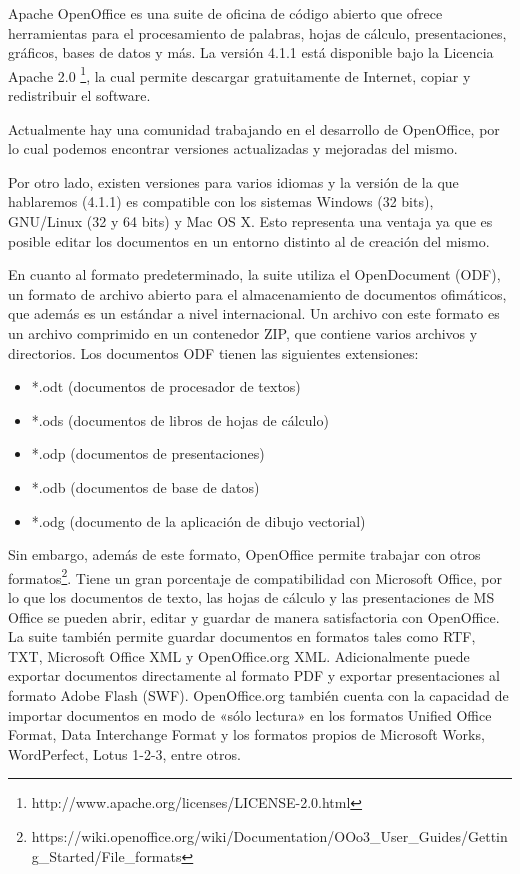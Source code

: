 \documentclass[12pt]{article}
\begin{document}
Apache OpenOffice es una suite de oficina de código abierto que ofrece herramientas para el procesamiento de palabras, hojas de cálculo, presentaciones, gráficos, bases de datos y más. La versión 4.1.1 está disponible bajo la Licencia Apache 2.0 \footnote{http://www.apache.org/licenses/LICENSE-2.0.html}, la cual permite descargar gratuitamente de Internet, copiar y redistribuir el software.   

Actualmente hay una comunidad trabajando en el desarrollo de OpenOffice, por lo cual podemos encontrar versiones actualizadas y mejoradas del mismo.

Por otro lado, existen versiones para varios idiomas y la versión de la que hablaremos (4.1.1) es compatible con los sistemas Windows (32 bits), GNU/Linux (32 y 64 bits) y Mac OS X. Esto representa una ventaja ya que es posible editar los documentos en un entorno distinto al de creación del mismo.


En cuanto al formato predeterminado, la suite utiliza el OpenDocument (ODF), un formato de archivo abierto para el almacenamiento de documentos ofimáticos, que además es un estándar a nivel internacional. Un archivo con este formato es un archivo comprimido en un contenedor ZIP, que contiene varios archivos y directorios. Los documentos ODF tienen las siguientes extensiones:
\begin{itemize}
\item *.odt (documentos de procesador de textos)
\item *.ods (documentos de libros de hojas de cálculo)
\item *.odp (documentos de presentaciones)
\item *.odb (documentos de base de datos)
\item *.odg (documento de la aplicación de dibujo vectorial)
\end{itemize}

Sin embargo, además de este formato, OpenOffice permite trabajar con otros formatos\footnote{https://wiki.openoffice.org/wiki/Documentation/OOo3\_User\_Guides/Getting\_Started/File\_formats}. Tiene un gran porcentaje de compatibilidad con Microsoft Office, por lo que los documentos de texto, las hojas de cálculo y las presentaciones de MS Office se pueden abrir, editar y guardar de manera satisfactoria con OpenOffice. La suite también permite guardar documentos en formatos tales como RTF, TXT, Microsoft Office XML y OpenOffice.org XML. Adicionalmente puede exportar documentos directamente al formato PDF y exportar presentaciones al formato Adobe Flash (SWF). OpenOffice.org también cuenta con la capacidad de importar documentos en modo de «sólo lectura» en los formatos Unified Office Format, Data Interchange Format y los formatos propios de Microsoft Works, WordPerfect, Lotus 1-2-3, entre otros.
\end{document}
